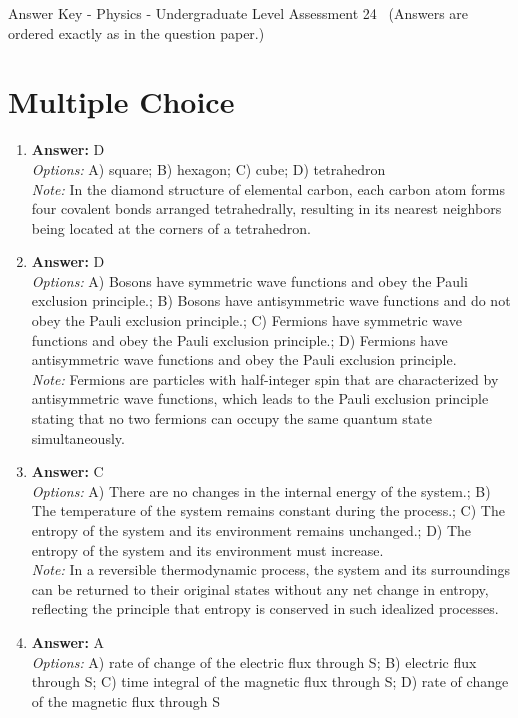 \documentclass[12pt]{article}
\begin{document}
\begin{center}
Answer Key - Physics - Undergraduate Level Assessment 24 \
\small (Answers are ordered exactly as in the question paper.)
\end{center}

\section*{Multiple Choice}
\begin{enumerate}[label=\arabic*.]
\item \textbf{Answer:} D
\\ \textit{Options:} A) square; B) hexagon; C) cube; D) tetrahedron
\\ \textit{Note:} In the diamond structure of elemental carbon, each carbon atom forms four covalent bonds arranged tetrahedrally, resulting in its nearest neighbors being located at the corners of a tetrahedron.
\item \textbf{Answer:} D
\\ \textit{Options:} A) Bosons have symmetric wave functions and obey the Pauli exclusion principle.; B) Bosons have antisymmetric wave functions and do not obey the Pauli exclusion principle.; C) Fermions have symmetric wave functions and obey the Pauli exclusion principle.; D) Fermions have antisymmetric wave functions and obey the Pauli exclusion principle.
\\ \textit{Note:} Fermions are particles with half-integer spin that are characterized by antisymmetric wave functions, which leads to the Pauli exclusion principle stating that no two fermions can occupy the same quantum state simultaneously.
\item \textbf{Answer:} C
\\ \textit{Options:} A) There are no changes in the internal energy of the system.; B) The temperature of the system remains constant during the process.; C) The entropy of the system and its environment remains unchanged.; D) The entropy of the system and its environment must increase.
\\ \textit{Note:} In a reversible thermodynamic process, the system and its surroundings can be returned to their original states without any net change in entropy, reflecting the principle that entropy is conserved in such idealized processes.
\item \textbf{Answer:} A
\\ \textit{Options:} A) rate of change of the electric flux through S; B) electric flux through S; C) time integral of the magnetic flux through S; D) rate of change of the magnetic flux through S

\end{enumerate}
\end{document}
